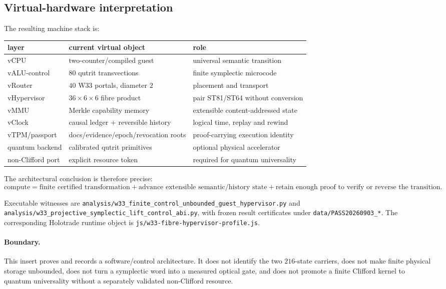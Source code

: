 \subsection*{Virtual-hardware interpretation}

The resulting machine stack is:
\begin{center}
\begin{tabular}{lll}
\hline
layer & current virtual object & role\\
\hline
vCPU & two-counter/compiled guest & universal semantic transition\\
vALU-control & $80$ qutrit transvections & finite symplectic microcode\\
vRouter & $40$ W33 portals, diameter $2$ & placement and transport\\
vHypervisor & $36\times6\times6$ fibre product & pair ST81/ST64 without conversion\\
vMMU & Merkle capability memory & extensible content-addressed state\\
vClock & causal ledger + reversible history & logical time, replay and rewind\\
vTPM/passport & docs/evidence/epoch/revocation roots & proof-carrying execution identity\\
quantum backend & calibrated qutrit primitives & optional physical accelerator\\
non-Clifford port & explicit resource token & required for quantum universality\\
\hline
\end{tabular}
\end{center}

The architectural conclusion is therefore precise:
\[
\boxed{
\text{compute}
=
\text{finite certified transformation}
+
\text{advance extensible semantic/history state}
+
\text{retain enough proof to verify or reverse the transition}.
}
\]

Executable witnesses are
\texttt{analysis/w33\_finite\_control\_unbounded\_guest\_hypervisor.py} and
\texttt{analysis/w33\_projective\_symplectic\_lift\_control\_abi.py}, with frozen
result certificates under \texttt{data/PASS20260903\_*}.  The corresponding Holotrade
runtime object is \texttt{js/w33-fibre-hypervisor-profile.js}.

\paragraph{Boundary.}
This insert proves and records a software/control architecture.  It does not identify the
two $216$-state carriers, does not make finite physical storage unbounded, does not turn a
symplectic word into a measured optical gate, and does not promote a finite Clifford
kernel to quantum universality without a separately validated non-Clifford resource.
